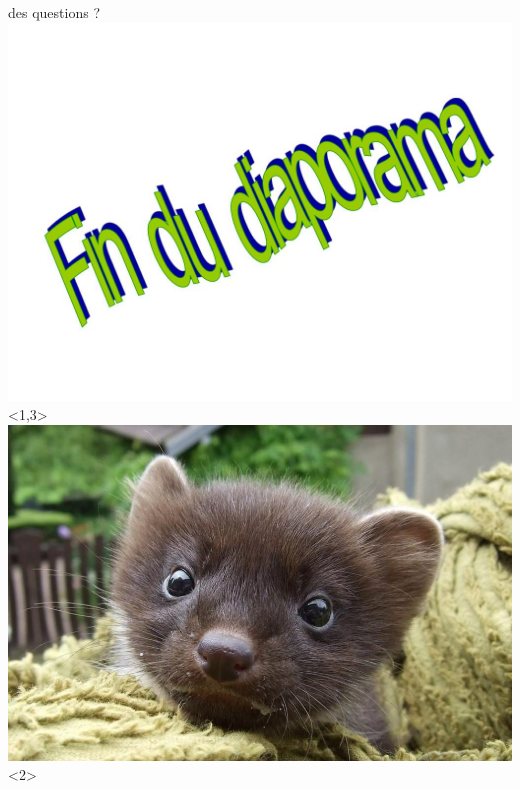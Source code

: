 \documentclass{beamer}
\begin{document}
\begin{frame}
\flushright des questions ?
\includegraphics[scale=.48]{fin}<1,3>
\includegraphics[scale=.4]{fouinefin}<2>
\end{frame}
\end{document}
